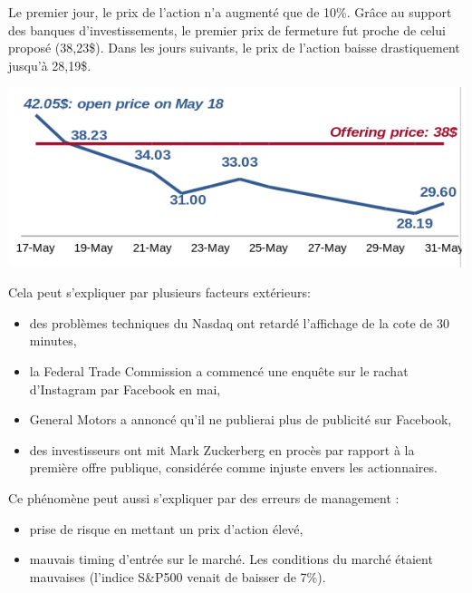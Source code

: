 \documentclass[a4paper,10pt]{article}
\begin{document}
Le premier jour, le prix de l'action n'a augmenté que de 10\%. Grâce au support des banques d'investissements, le premier prix de fermeture fut proche de celui proposé (38,23\$). Dans les jours suivants, le prix de l'action baisse drastiquement jusqu'à 28,19\$.\\
\begin{center}
\includegraphics[scale=0.4]{images/FBIPO.png}
\end{center}

Cela peut s'expliquer par plusieurs facteurs extérieurs:
\begin{itemize}
\item des problèmes techniques du Nasdaq ont retardé l'affichage de la cote de 30 minutes,
\item la Federal Trade Commission a commencé une enquête sur le rachat d'Instagram par Facebook en mai,
\item General Motors a annoncé qu'il ne publierai plus de publicité sur Facebook,
\item des investisseurs ont mit Mark Zuckerberg en procès par rapport à la première offre publique, considérée comme injuste envers les actionnaires.
\end{itemize}
Ce phénomène peut aussi s'expliquer par des erreurs de management :
\begin{itemize}
\item prise de risque en mettant un prix d'action élevé,
\item mauvais timing d'entrée sur le marché. Les conditions du marché étaient mauvaises (l'indice S\&P500 venait de baisser de 7\%).\\
\end{itemize}
\end{document}
